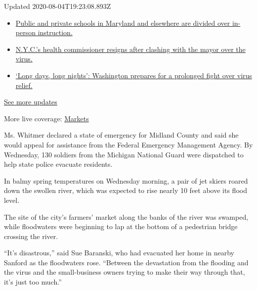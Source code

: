 Updated 2020-08-04T19:23:08.893Z

\begin{itemize}
\tightlist
\item
  \href{https://www.nytimes.com/2020/08/04/world/coronavirus-cases.html?action=click\&pgtype=Article\&state=default\&region=MAIN_CONTENT_1\&context=storylines_live_updates\#link-4825b93}{Public
  and private schools in Maryland and elsewhere are divided over
  in-person instruction.}
\item
  \href{https://www.nytimes.com/2020/08/04/world/coronavirus-cases.html?action=click\&pgtype=Article\&state=default\&region=MAIN_CONTENT_1\&context=storylines_live_updates\#link-4d1eafa8}{N.Y.C.'s
  health commissioner resigns after clashing with the mayor over the
  virus.}
\item
  \href{https://www.nytimes.com/2020/08/04/world/coronavirus-cases.html?action=click\&pgtype=Article\&state=default\&region=MAIN_CONTENT_1\&context=storylines_live_updates\#link-6b644638}{`Long
  days, long nights': Washington prepares for a prolonged fight over
  virus relief.}
\end{itemize}

\href{https://www.nytimes.com/2020/08/04/world/coronavirus-cases.html?action=click\&pgtype=Article\&state=default\&region=MAIN_CONTENT_1\&context=storylines_live_updates}{See
more updates}

More live coverage:
\href{https://www.nytimes.com/live/2020/08/04/business/stock-market-today-coronavirus?action=click\&pgtype=Article\&state=default\&region=MAIN_CONTENT_1\&context=storylines_live_updates}{Markets}

Ms. Whitmer declared a state of emergency for Midland County and said
she would appeal for assistance from the Federal Emergency Management
Agency. By Wednesday, 130 soldiers from the Michigan National Guard were
dispatched to help state police evacuate residents.

In balmy spring temperatures on Wednesday morning, a pair of jet skiers
roared down the swollen river, which was expected to rise nearly 10 feet
above its flood level.

The site of the city's farmers' market along the banks of the river was
swamped, while floodwaters were beginning to lap at the bottom of a
pedestrian bridge crossing the river.

``It's disastrous,'' said Sue Baranski, who had evacuated her home in
nearby Sanford as the floodwaters rose. ``Between the devastation from
the flooding and the virus and the small-business owners trying to make
their way through that, it's just too much.''

